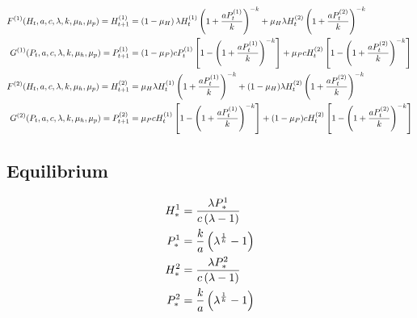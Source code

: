 \documentclass{article}
\begin{document}
\newcommand{\Ht}[1] {H^{(#1)}_t}
\newcommand{\Pt}[1] {P^{(#1)}_t}
\newcommand{\Htt}[1] {H^{(#1)}_{t+1}}
\newcommand{\Ptt}[1] {P^{(#1)}_{t+1}}
\newcommand{\apk}[1] {\pn{1+\frac{a\Pt{#1}}{k}}}

\newcommand{\lt}{\left}
\newcommand{\rt}{\right}

\begin{align*}
    F^{(1)}(H_t, a, c, \lambda, k, \mu_h, \mu_p) = \Htt{1} &= \pn{1-\mu_H} \lambda \Ht{1} \apk{1}^{-k} + \mu_H \lambda \Ht{2} \apk{2}^{-k}\\
    G^{(1)}(P_t, a, c, \lambda, k, \mu_h, \mu_p) = \Ptt{1} &= (1-\mu_P) c \Pt{1} \lt[1-\apk{1}^{-k}\rt] + \mu_P c \Ht{2} \lt[1-\apk{2}^{-k}\rt]\\
    F^{(2)}(H_t, a, c, \lambda, k, \mu_h, \mu_p) = \Htt{2} &= \mu_H \lambda \Ht{1} \apk{1}^{-k} + (1-\mu_H) \lambda \Ht{2} \apk{2}^{-k}\\
    G^{(2)}(P_t, a, c, \lambda, k, \mu_h, \mu_p) = \Ptt{2} &= \mu_P c \Ht{1} \lt[1-\apk{1}^{-k}\rt] + (1-\mu_P) c \Ht{2} \lt[1-\apk{2}^{-k}\rt]
\end{align*}

\subsection{Equilibrium}
\begin{align*}
    H^{1}_* &= \frac{\lambda P^{1}_*}{c\left(\lambda - 1\right)}\\
    P^{1}_* &= \frac{k}{a} \left(\lambda^{\frac{1}{k}} - 1\right)\\
    H^{2}_* &= \frac{\lambda P^{2}_*}{c\left(\lambda - 1\right)}\\
    P^{2}_* &= \frac{k}{a} \left(\lambda^{\frac{1}{k}} - 1\right)
\end{align*}
\end{document}
